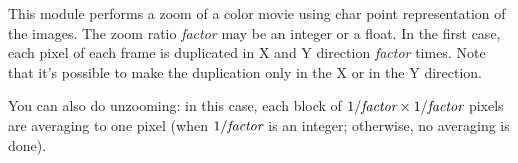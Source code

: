 This module performs a zoom of a color movie using char point representation of
the images.
The zoom ratio {\em factor} may be an integer or a float.
In the first case, each pixel of each frame
is duplicated in X and Y direction {\em factor} times. 
Note that it's possible to make the duplication only in the X or in the Y
direction.

You can also do unzooming: in this case, each block of $1/\mbox{\em factor} \times 1/\mbox{\em factor}$ pixels are averaging to one pixel (when $1/\mbox{\em factor}$ is an integer; otherwise, no averaging is done).



